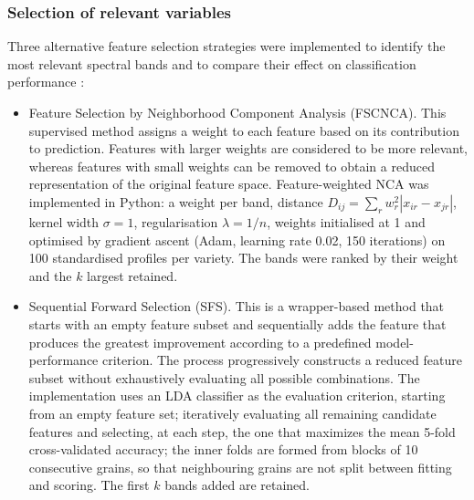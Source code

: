 \documentclass[final,5p,times,twocolumn]{elsarticle}
\newcommand{\added}[1]{{\color{blue}#1}}
\begin{document}
\subsubsection{Selection of relevant variables}\label{sec_feature_selection}

Three alternative feature selection strategies were implemented to identify the most relevant spectral bands and to compare their effect on classification performance \cite{Rahmani2022, Castro2022cafs}: 

\begin{itemize}
    \item [-] Feature Selection by Neighborhood Component Analysis (FSCNCA).
    This supervised method assigns a weight to each feature based on its contribution to prediction. 
    Features with larger weights are considered to be more relevant, whereas features with small weights can be removed to obtain a reduced representation of the original feature space.
    \added{Feature-weighted NCA \citep{Yang2012nca} was implemented in Python: a weight per band, distance $D_{ij}=\sum_r w_r^2|x_{ir}-x_{jr}|$, kernel width $\sigma=1$, regularisation $\lambda=1/n$, weights initialised at 1 and optimised by gradient ascent (Adam, learning rate 0.02, 150 iterations) on 100 standardised profiles per variety. The bands were ranked by their weight and the $k$ largest retained.}
    
    \item [-] Sequential Forward Selection (SFS).
    This is a wrapper-based method that starts with an empty feature subset and sequentially adds the feature that produces the greatest improvement according to a predefined model-performance criterion.
    The process progressively constructs a reduced feature subset without exhaustively evaluating all possible combinations. 
    The implementation uses an LDA classifier as the evaluation criterion, starting from an empty feature set; iteratively evaluating all remaining candidate features and selecting, at each step, the one that maximizes the mean 5-fold cross-validated accuracy; \added{the inner folds are formed from blocks of 10 consecutive grains, so that neighbouring grains are not split between fitting and scoring}. The first $k$ bands added are retained.


\end{itemize}
\end{document}
